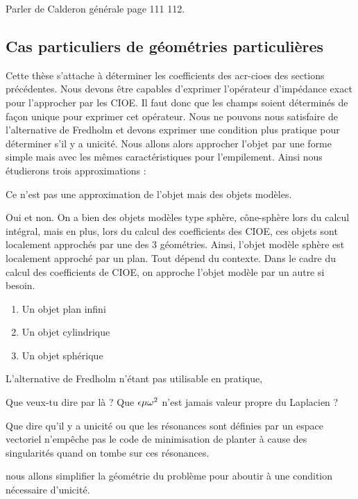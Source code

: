     \begin{REM}
      Parler de Calderon générale page 111 112.
    \end{REM}

  \subsection{Cas particuliers de géométries particulières}
    Cette thèse s'attache à déterminer les coefficients des \glspl{acr-cioe} des sections précédentes.
    Nous devons être capables d'exprimer l'opérateur d'impédance exact pour l'approcher par les CIOE.
    Il faut donc que les champs soient déterminés de façon unique pour exprimer cet opérateur. Nous ne pouvons nous satisfaire de l'alternative de Fredholm et devons exprimer une condition plus pratique pour déterminer s'il y a unicité.
    Nous allons alors approcher l'objet par une forme simple mais avec les mêmes caractéristiques pour l'empilement. Ainsi nous étudierons trois approximations :
    \begin{REM}
      Ce n'est pas une approximation de l'objet mais des objets modèles.
    \end{REM}
    \begin{REP}
      Oui et non. 
      On a bien des objets modèles type sphère, cône-sphère lors du calcul intégral, mais en plus, lors du calcul des coefficients des CIOE, ces objets sont localement approchés par une des 3 géométries. 
      Ainsi, l'objet modèle sphère est localement approché par un plan. 
      Tout dépend du contexte.
      Dans le cadre du calcul des coefficients de CIOE, on approche l'objet modèle par un autre si besoin.
    \end{REP}
    \begin{enumerate}
      \item Un objet plan infini 
      \item Un objet cylindrique
      \item Un objet sphérique
    \end{enumerate}
   
    L'alternative de Fredholm n'étant pas utilisable en pratique,
    \begin{REM}
      Que veux-tu dire par là ? Que \(\epsilon\mu\omega^2\) n'est jamais valeur propre du Laplacien ?
    \end{REM}
    \begin{REP}
      Que dire qu'il y a unicité ou que les résonances sont définies par un espace vectoriel n’empêche pas le code de minimisation de planter à cause des singularités quand on tombe sur ces résonances.
    \end{REP}
    nous allons simplifier la géométrie du problème pour aboutir à une condition nécessaire d'unicité.

